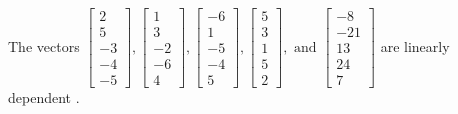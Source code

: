 \begin{exercise}
\begin{exerciseStatement}
  \end{exerciseStatement}
  \begin{exerciseAnswer}
   The vectors \(\left[\begin{array}{r}
2 \\
5 \\
-3 \\
-4 \\
-5
\end{array}\right] , \left[\begin{array}{r}
1 \\
3 \\
-2 \\
-6 \\
4
\end{array}\right] , \left[\begin{array}{r}
-6 \\
1 \\
-5 \\
-4 \\
5
\end{array}\right] , \left[\begin{array}{r}
5 \\
3 \\
1 \\
5 \\
2
\end{array}\right] , \text{ and } \left[\begin{array}{r}
-8 \\
-21 \\
13 \\
24 \\
7
\end{array}\right]\) are 
  	 linearly dependent  .
  


  \end{exerciseAnswer}
\end{exercise}